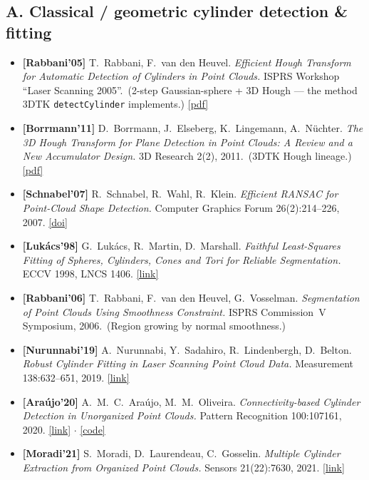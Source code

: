 \documentclass[10pt,a4paper]{article}
\begin{document}
{\small

\subsection*{A. Classical / geometric cylinder detection \& fitting}
\begin{itemize}[leftmargin=1.4em,itemsep=3pt,topsep=2pt]
  \item \textbf{[Rabbani'05]} T.~Rabbani, F.~van den Heuvel. \emph{Efficient Hough
  Transform for Automatic Detection of Cylinders in Point Clouds.} ISPRS Workshop ``Laser
  Scanning 2005''. \,(2-step Gaussian-sphere + 3D Hough --- the method 3DTK
  \texttt{detectCylinder} implements.) \href{https://www.isprs.org/proceedings/XXXVI/3-W19/papers/060.pdf}{[pdf]}
  \item \textbf{[Borrmann'11]} D.~Borrmann, J.~Elseberg, K.~Lingemann, A.~N\"uchter.
  \emph{The 3D Hough Transform for Plane Detection in Point Clouds: A Review and a New
  Accumulator Design.} 3D Research 2(2), 2011. \,(3DTK Hough lineage.)
  \href{https://robotik.informatik.uni-wuerzburg.de/telematics/download/3dresearch2011.pdf}{[pdf]}
  \item \textbf{[Schnabel'07]} R.~Schnabel, R.~Wahl, R.~Klein. \emph{Efficient RANSAC for
  Point-Cloud Shape Detection.} Computer Graphics Forum 26(2):214--226, 2007.
  \href{https://onlinelibrary.wiley.com/doi/10.1111/j.1467-8659.2007.01016.x}{[doi]}
  \item \textbf{[Luk\'acs'98]} G.~Luk\'acs, R.~Martin, D.~Marshall. \emph{Faithful
  Least-Squares Fitting of Spheres, Cylinders, Cones and Tori for Reliable Segmentation.}
  ECCV 1998, LNCS 1406. \href{https://link.springer.com/chapter/10.1007/BFb0055697}{[link]}
  \item \textbf{[Rabbani'06]} T.~Rabbani, F.~van den Heuvel, G.~Vosselman.
  \emph{Segmentation of Point Clouds Using Smoothness Constraint.} ISPRS Commission~V
  Symposium, 2006. \,(Region growing by normal smoothness.)
  \item \textbf{[Nurunnabi'19]} A.~Nurunnabi, Y.~Sadahiro, R.~Lindenbergh, D.~Belton.
  \emph{Robust Cylinder Fitting in Laser Scanning Point Cloud Data.} Measurement
  138:632--651, 2019. \href{https://www.sciencedirect.com/science/article/abs/pii/S0263224119301046}{[link]}
  \item \textbf{[Ara\'ujo'20]} A.~M.~C.~Ara\'ujo, M.~M.~Oliveira. \emph{Connectivity-based
  Cylinder Detection in Unorganized Point Clouds.} Pattern Recognition 100:107161, 2020.
  \href{https://www.sciencedirect.com/science/article/abs/pii/S0031320319304613}{[link]}
  $\cdot$ \href{https://www.inf.ufrgs.br/~oliveira/pubs_files/CD/CD.html}{[code]}
  \item \textbf{[Moradi'21]} S.~Moradi, D.~Laurendeau, C.~Gosselin. \emph{Multiple Cylinder
  Extraction from Organized Point Clouds.} Sensors 21(22):7630, 2021.
  \href{https://www.mdpi.com/1424-8220/21/22/7630}{[link]}
\end{itemize}

}
\end{document}
